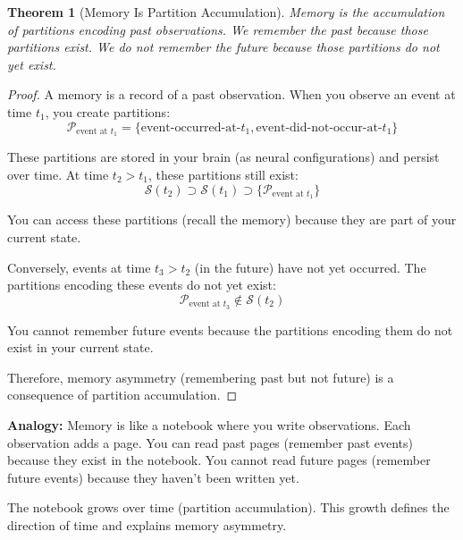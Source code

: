 \documentclass[twocolumn,10pt]{article}
\newtheorem{theorem}{Theorem}[section]
\theoremstyle{definition}
\theoremstyle{remark}
\begin{document}
\begin{theorem}[Memory Is Partition Accumulation]
\label{thm:memory_is_partitions}
Memory is the accumulation of partitions encoding past observations. We remember the past because those partitions exist. We do not remember the future because those partitions do not yet exist.
\end{theorem}

\begin{proof}
A memory is a record of a past observation. When you observe an event at time $t_1$, you create partitions:
\begin{equation}
\mathcal{P}_{\text{event at } t_1} = \{\text{event-occurred-at-}t_1, \text{event-did-not-occur-at-}t_1\}
\end{equation}

These partitions are stored in your brain (as neural configurations) and persist over time. At time $t_2 > t_1$, these partitions still exist:
\begin{equation}
\mathcal{S}(t_2) \supset \mathcal{S}(t_1) \supset \{\mathcal{P}_{\text{event at } t_1}\}
\end{equation}

You can access these partitions (recall the memory) because they are part of your current state.

Conversely, events at time $t_3 > t_2$ (in the future) have not yet occurred. The partitions encoding these events do not yet exist:
\begin{equation}
\mathcal{P}_{\text{event at } t_3} \notin \mathcal{S}(t_2)
\end{equation}

You cannot remember future events because the partitions encoding them do not exist in your current state.

Therefore, memory asymmetry (remembering past but not future) is a consequence of partition accumulation.
\end{proof}

\noindent\textbf{Analogy:} Memory is like a notebook where you write observations. Each observation adds a page. You can read past pages (remember past events) because they exist in the notebook. You cannot read future pages (remember future events) because they haven't been written yet.

\vspace{0.2cm}
\noindent The notebook grows over time (partition accumulation). This growth defines the direction of time and explains memory asymmetry.
\end{document}
